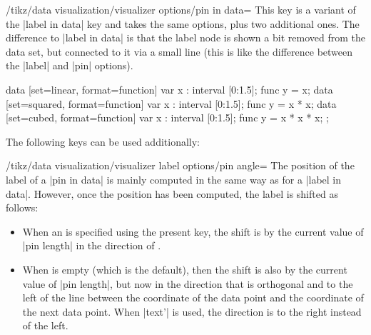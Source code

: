\begin{key}{/tikz/data visualization/visualizer options/pin in data=}
    This key is a variant of the |label in data| key and takes the same
    options, plus two additional ones. The difference to |label in data| is
    that the label node is shown a bit removed from the data set, but connected
    to it via a small line (this is like the difference between the |label| and
    |pin| options).
\begin{codeexample}[width=6.3cm]
\tikz \datavisualization [
  scientific axes=clean,
  visualize as smooth line/.list={linear, squared, cubed},
  linear ={pin in data={text=$2x$}},
  squared={pin in data={text=$x^2$}},
  cubed  ={pin in data={text=$x^3$}}]
data [set=linear, format=function] {
  var x : interval [0:1.5];
  func y = \value x;
}
data [set=squared, format=function] {
  var x : interval [0:1.5];
  func y = \value x * \value x;
}
data [set=cubed, format=function] {
  var x : interval [0:1.5];
  func y = \value x * \value x * \value x;
};
\end{codeexample}
    The following keys can be used additionally:
    \begin{key}{/tikz/data visualization/visualizer label options/pin angle=}
        The position of the label of a |pin in data| is mainly computed in the
        same way as for a |label in data|. However, once the position has been
        computed, the label is shifted as follows:
        \begin{itemize}
            \item When an  is specified using the present key, the
                shift is by the current value of |pin length| in the direction
                of .
            \item When  is empty (which is the default), then the
                shift is also by the current value of |pin length|, but now in
                the direction that is orthogonal and to the left of the line
                between the coordinate of the data point and the coordinate of
                the next data point. When |text'| is used, the direction is to
                the right instead of the left.
        \end{itemize}
    \end{key}


\end{key}

